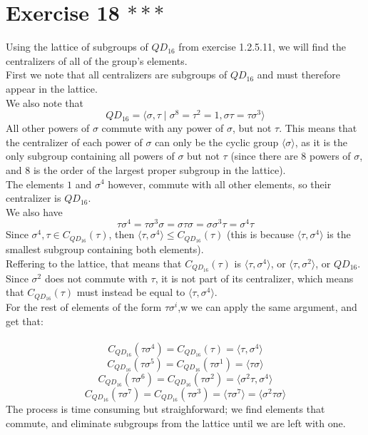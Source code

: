 \documentclass[12pt]{article}
\begin{document}
    \section*{Exercise 18 $***$}
    Using the lattice of subgroups of $QD_{16}$
    from exercise 1.2.5.11,
    we will find the centralizers of all of the group's elements. \\
    First we note that all centralizers are subgroups of $QD_{16}$
    and must therefore appear in the lattice. \\
    We also note that
    \[ QD_{16} = \langle \sigma, \tau \mid \sigma^8 = \tau^2 = 1,
    \sigma\tau = \tau\sigma^3 \rangle \]
    All other powers of $\sigma$ commute with any power of $\sigma$,
    but not $\tau$.
    This means that the centralizer of each power of $\sigma$ can only be
    the cyclic group $\langle \sigma \rangle$,
    as it is the only subgroup containing all powers of $\sigma$
    but not $\tau$
    (since there are $8$ powers of $\sigma$,
    and $8$ is the order of the largest proper subgroup in the lattice). \\
    The elements $1$ and $\sigma^4$ however,
    commute with all other elements,
    so their centralizer is $QD_{16}$. \\
    We also have 
    \[ \tau\sigma^4 
    = \tau\sigma^3\sigma
    = \sigma\tau\sigma 
    = \sigma\sigma^3\tau
    = \sigma^4\tau \] 
    Since $\sigma^4, \tau \in C_{QD_{16}}(\tau)$,
    then $\langle \tau, \sigma^4 \rangle \leqslant C_{QD_{16}}(\tau)$
    (this is because $\langle \tau, \sigma^4 \rangle$
    is the smallest subgroup containing both elements). \\
    Reffering to the lattice,
    that means that $C_{QD_{16}}(\tau)$
    is $\langle \tau, \sigma^4 \rangle$,
    or $\langle \tau, \sigma^2 \rangle$,
    or $QD_{16}$.
    Since $\sigma^2$ does not commute with $\tau$,
    it is not part of its centralizer,
    which means that  $C_{QD_{16}}(\tau)$ must instead be equal to
    $\langle \tau, \sigma^4 \rangle$. \\
    For the rest of elements of the form $\tau\sigma^i$,w
    we can apply the same argument, and get that: \\\
    \[ C_{QD_{16}}(\tau\sigma^4) 
    = C_{QD_{16}}(\tau) 
    = \langle \tau, \sigma^4 \rangle \]
    \[ C_{QD_{16}}(\tau\sigma^5) 
    = C_{QD_{16}}(\tau\sigma^1) 
    = \langle \tau\sigma \rangle \]
    \[ C_{QD_{16}}(\tau\sigma^6) 
    = C_{QD_{16}}(\tau\sigma^2) 
    = \langle \sigma^2\tau, \sigma^4 \rangle \]
    \[ C_{QD_{16}}(\tau\sigma^7) 
    = C_{QD_{16}}(\tau\sigma^3) 
    = \langle \tau\sigma^7 \rangle
    =  \langle \sigma^2\tau\sigma \rangle \]
    The process is time consuming but straighforward;
    we find elements that commute,
    and eliminate subgroups from the lattice until we are left with one.
\end{document}
